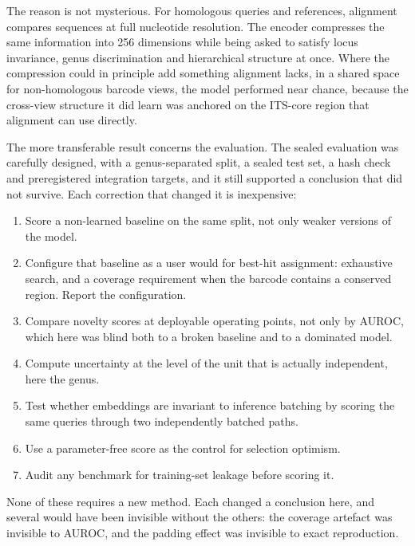 \documentclass[11pt]{article}
\begin{document}
The reason is not mysterious. For homologous queries and references, alignment
compares sequences at full nucleotide resolution. The encoder compresses the
same information into 256 dimensions while being asked to satisfy locus
invariance, genus discrimination and hierarchical structure at once. Where the
compression could in principle add something alignment lacks, in a shared space
for non-homologous barcode views, the model performed near chance, because the
cross-view structure it did learn was anchored on the ITS-core region that
alignment can use directly.

The more transferable result concerns the evaluation. The sealed evaluation was
carefully designed, with a genus-separated split, a sealed test set, a hash
check and preregistered integration targets, and it still supported a
conclusion that did not survive. Each correction that changed it is inexpensive:
\begin{enumerate}\itemsep0pt
\item Score a non-learned baseline on the same split, not only weaker versions
of the model.
\item Configure that baseline as a user would for best-hit assignment:
exhaustive search, and a coverage requirement when the barcode contains a
conserved region. Report the configuration.
\item Compare novelty scores at deployable operating points, not only by AUROC,
which here was blind both to a broken baseline and to a dominated model.
\item Compute uncertainty at the level of the unit that is actually independent,
here the genus.
\item Test whether embeddings are invariant to inference batching by scoring the
same queries through two independently batched paths.
\item Use a parameter-free score as the control for selection optimism.
\item Audit any benchmark for training-set leakage before scoring it.
\end{enumerate}
None of these requires a new method. Each changed a conclusion here, and several
would have been invisible without the others: the coverage artefact was
invisible to AUROC, and the padding effect was invisible to exact
reproduction.
\end{document}
